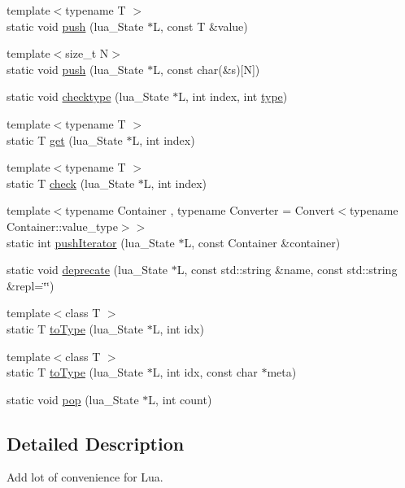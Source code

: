 \begin{DoxyCompactItemize}
\item 
{\footnotesize template$<$typename T $>$ }\\static void \hyperlink{a00040_a249530d9870ce9f6e44eb4abaa755b08}{push} (lua\-\_\-\-State $\ast$L, const T \&value)
\item 
{\footnotesize template$<$size\-\_\-t N$>$ }\\static void \hyperlink{a00040_a2439cfdbb71f9a1d5fd89d1fea0f181a}{push} (lua\-\_\-\-State $\ast$L, const char(\&s)\mbox{[}N\mbox{]})
\item 
static void \hyperlink{a00040_a6edfb4eb5ca54a7acbad38f84efc27fc}{checktype} (lua\-\_\-\-State $\ast$L, int index, int \hyperlink{a00040_a3169e5668debd4dfb3c3618cb0bec056}{type})
\item 
{\footnotesize template$<$typename T $>$ }\\static T \hyperlink{a00040_a12e4832511a25ade1557d10a05e1ef76}{get} (lua\-\_\-\-State $\ast$L, int index)
\item 
{\footnotesize template$<$typename T $>$ }\\static T \hyperlink{a00040_a74b3f48a2970c646574eb85c777cbf63}{check} (lua\-\_\-\-State $\ast$L, int index)
\item 
{\footnotesize template$<$typename Container , typename Converter  = Convert$<$typename Container\-::value\-\_\-type$>$$>$ }\\static int \hyperlink{a00040_a7929d6a74e7c75e4646100bbe36b9ae9}{push\-Iterator} (lua\-\_\-\-State $\ast$L, const Container \&container)
\item 
static void \hyperlink{a00040_a395066480c860d8c71ca145755663eef}{deprecate} (lua\-\_\-\-State $\ast$L, const std\-::string \&name, const std\-::string \&repl=\char`\"{}\char`\"{})
\item 
{\footnotesize template$<$class T $>$ }\\static T \hyperlink{a00040_a754171d47fe864fd2f405899c1915e24}{to\-Type} (lua\-\_\-\-State $\ast$L, int idx)
\item 
{\footnotesize template$<$class T $>$ }\\static T \hyperlink{a00040_add7351291ed87d1460fe1e11ebe0039e}{to\-Type} (lua\-\_\-\-State $\ast$L, int idx, const char $\ast$meta)
\item 
static void \hyperlink{a00040_a0de148ecf204e369e71466d78ff198a6}{pop} (lua\-\_\-\-State $\ast$L, int count)
\end{DoxyCompactItemize}


\subsection{Detailed Description}
Add lot of convenience for Lua. 

